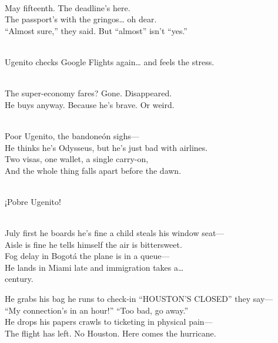 \begin{lyrics}

\\
May fifteenth. %
The deadline’s here.\\
The passport’s with the gringos… oh dear.\\
“Almost sure,” they said. %
But “almost” isn’t “yes.”


\\
Ugenito checks Google Flights again… and feels the stress.


\\
The super-economy fares? Gone. %
Disappeared.\\
He buys anyway. %
Because he’s brave. %
Or weird.


\\
Poor Ugenito, the bandoneón sighs—\\
He thinks he’s Odysseus, but he’s just bad with airlines.\\
Two visas, one wallet, a single carry-on,\\
And the whole thing falls apart before the dawn.

\\
¡Pobre Ugenito!


\\
July first he boards he’s fine a child steals his window seat—\\
Aisle is fine he tells himself the air is bittersweet.\\
Fog delay in Bogotá the plane is in a queue—\\
He lands in Miami late and immigration takes a…\\
century.


He grabs his bag he runs to check-in “HOUSTON’S CLOSED” they say—\\
“My connection’s in an hour!” “Too bad, go away.”\\
He drops his papers crawls to ticketing in physical pain—\\
The flight has left. %
No Houston. %
Here comes the hurricane.


\end{lyrics}

